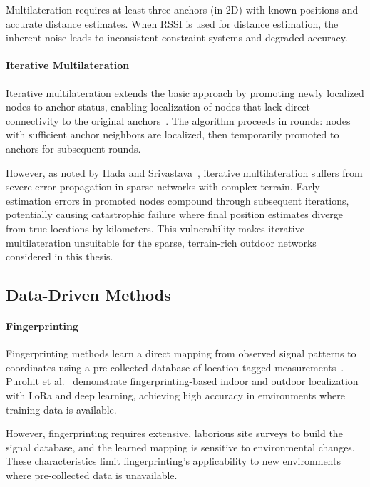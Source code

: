 \documentclass[master,final,11pt]{iscs-thesis}
\begin{document}
Multilateration requires at least three anchors (in 2D) with known positions and accurate distance estimates.
When RSSI is used for distance estimation, the inherent noise leads to inconsistent constraint systems and degraded accuracy.

\paragraph{Iterative Multilateration}
Iterative multilateration extends the basic approach by promoting newly localized nodes to anchor status, enabling localization of nodes that lack direct connectivity to the original anchors~\cite{hada2025hybrid}.
The algorithm proceeds in rounds: nodes with sufficient anchor neighbors are localized, then temporarily promoted to anchors for subsequent rounds.

However, as noted by Hada and Srivastava~\cite{hada2025hybrid}, iterative multilateration suffers from severe error propagation in sparse networks with complex terrain.
Early estimation errors in promoted nodes compound through subsequent iterations, potentially causing catastrophic failure where final position estimates diverge from true locations by kilometers.
This vulnerability makes iterative multilateration unsuitable for the sparse, terrain-rich outdoor networks considered in this thesis.

\subsection{Data-Driven Methods}

\paragraph{Fingerprinting}
Fingerprinting methods learn a direct mapping from observed signal patterns to coordinates using a pre-collected database of location-tagged measurements~\cite{purohit2020fingerprinting}.
Purohit et al.~\cite{purohit2020fingerprinting} demonstrate fingerprinting-based indoor and outdoor localization with LoRa and deep learning, achieving high accuracy in environments where training data is available.

However, fingerprinting requires extensive, laborious site surveys to build the signal database, and the learned mapping is sensitive to environmental changes.
These characteristics limit fingerprinting's applicability to new environments where pre-collected data is unavailable.
\end{document}
